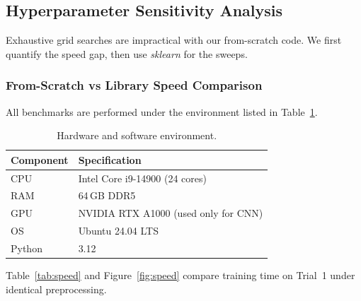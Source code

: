 \documentclass[11pt,a4paper]{article}
\begin{document}
\subsection{Hyperparameter Sensitivity Analysis}

Exhaustive grid searches are impractical with our from-scratch code. We first quantify the speed gap, then use \textit{sklearn} for the sweeps.

\subsubsection{From-Scratch vs Library Speed Comparison}
\label{sec:speed}

All benchmarks are performed under the environment listed in Table~\ref{tab:env}.

\begin{table}[H]
    \centering
    \renewcommand{\arraystretch}{1.15}
    \small
    \begin{tabular}{ll}
        \toprule
        \textbf{Component} & \textbf{Specification} \\
        \midrule
        CPU   & Intel Core i9-14900 (24 cores) \\
        RAM   & 64\,GB DDR5 \\
        GPU   & NVIDIA RTX A1000 (used only for CNN) \\
        OS    & Ubuntu 24.04 LTS \\
        Python & 3.12 \\
        \bottomrule
    \end{tabular}
    \caption{Hardware and software environment.}
    \label{tab:env}
\end{table}

\noindent Table~\ref{tab:speed} and Figure~\ref{fig:speed} compare training time on Trial~1 under identical preprocessing.
\end{document}
